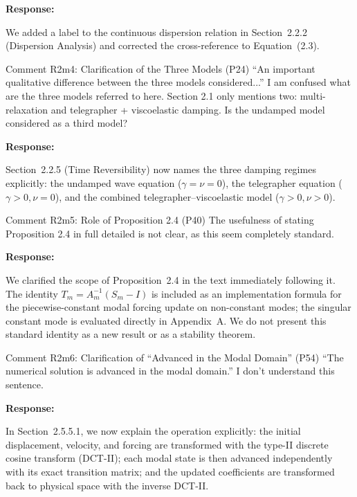 \documentclass[11pt,a4paper]{article}
\newenvironment{response}{
    \par\vspace{1mm}\noindent\textbf{\textcolor{responseframe}{Response:}}\par\vspace{1mm}
}{
    \par\vspace{3mm}
}
\begin{document}
\begin{response}
We added a label to the continuous dispersion relation in Section~2.2.2 (Dispersion Analysis) and corrected the cross-reference to Equation~(2.3).
\end{response}

\begin{revcomment}{Comment R2m4: Clarification of the Three Models (P24)}
``An important qualitative difference between the three models considered...'' I am confused what are the three models referred to here. Section 2.1 only mentions two: multi-relaxation and telegrapher + viscoelastic damping. Is the undamped model considered as a third model?
\end{revcomment}

\begin{response}
Section~2.2.5 (Time Reversibility) now names the three damping regimes explicitly: the undamped wave equation ($\gamma=\nu=0$), the telegrapher equation ($\gamma>0,\nu=0$), and the combined telegrapher--viscoelastic model ($\gamma>0,\nu>0$).
\end{response}

\begin{revcomment}{Comment R2m5: Role of Proposition 2.4 (P40)}
The usefulness of stating Proposition 2.4 in full detailed is not clear, as this seem completely standard.
\end{revcomment}

\begin{response}
We clarified the scope of Proposition~2.4 in the text immediately following it. The identity $T_m=A_m^{-1}(S_m-I)$ is included as an implementation formula for the piecewise-constant modal forcing update on non-constant modes; the singular constant mode is evaluated directly in Appendix~A. We do not present this standard identity as a new result or as a stability theorem.
\end{response}

\begin{revcomment}{Comment R2m6: Clarification of ``Advanced in the Modal Domain'' (P54)}
``The numerical solution is advanced in the modal domain.'' I don't understand this sentence.
\end{revcomment}

\begin{response}
In Section~2.5.5.1, we now explain the operation explicitly: the initial displacement, velocity, and forcing are transformed with the type-II discrete cosine transform (DCT-II); each modal state is then advanced independently with its exact transition matrix; and the updated coefficients are transformed back to physical space with the inverse DCT-II.
\end{response}
\end{document}
